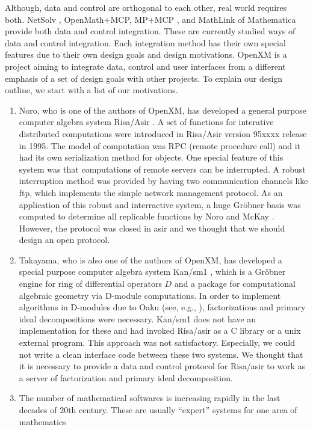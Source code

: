 Although, data and control are orthogonal to each other,
real world requires both.
NetSolv \cite{netsolve}, OpenMath$+$MCP, MP$+$MCP \cite{iamc},
and MathLink of Mathematica provide both data and control integration.
These are currently studied ways of data and control integration.
Each integration method has their own special features due to their
own design goals and design motivations.
OpenXM is a project aiming to integrate data, control and user interfaces
from a different emphasis of a set of design goals with other projects.
To explain our design outline, we start with a list of
our motivations.
\begin{enumerate}
\item Noro,  who is one of the authors of OpenXM, has developed a general
purpose computer algebra system Risa/Asir \cite{asir}.
A set of functions for interative distributed computations were introduced
in Risa/Asir version 95xxxx release in 1995.
The model of computation was RPC (remote procedure call)
and it had its own serialization method for objects.
One special feature of this system was that computations of remote servers can
be interrupted.
A robust interruption method was provided by having two communication channels
like ftp, which implements the simple network management protocol.
As an application of this robust and interractive system, 
a huge Gr\"obner basis was computed
to determine all replicable functions by Noro and McKay \cite{noro-mckay}.
However, the protocol was closed in asir and we thought that we should
design an open protocol.
\item Takayama, who is also one of the authors of OpenXM, has developed
a special purpose computer algebra system Kan/sm1 \cite{kan},
which is a Gr\"obner engine for ring of differential operators $D$ and
a package for computational algebraic geometry via D-module computations.
In order to implement algorithms in D-modules due to Oaku 
(see, e.g., \cite{sst-book}),
factorizations and primary ideal decompositions were necessary.
Kan/sm1 does not have an implementation for these and had invoked
Risa/asir as a C library or a unix external program.
This approach was not satisfactory.
Especially, we could not write a clean interface code between these
two systems.
We thought that it is necessary to provide a data and control protocol
for Risa/asir to work as a server of factorization and primary ideal
decomposition.
\item The number of mathematical softwares is increasing rapidly in the last
decades of 20th century.
These are usually ``expert'' systems for one area of mathematics

\end{enumerate}
